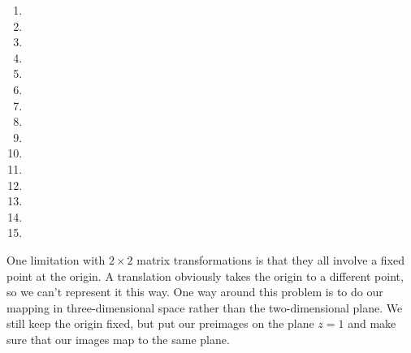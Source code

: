 \documentclass[../gatm.tex]{subfiles}
\begin{document}
\begin{enumerate}
\begin{multicols}{4}
\begin{enumerate}
\item {}
\item {}
\item {}
\item {}
\item {}
\item {}
\item {}
\item {}
\item {}
\item {}
\item {}
\item {}
\item {}
\item {}
\item {}
\end{enumerate}
\end{multicols}
\setcounter{mp_problem_i}{\value{enumi}}
\end{enumerate}

One limitation with $2\times 2$ matrix transformations is that they all involve a fixed point at the origin. A translation obviously takes the origin to a different point, so we can't represent it this way. One way around this problem is to do our mapping in three-dimensional space rather than the two-dimensional plane. We still keep the origin fixed, but put our preimages on the plane $z=1$ and make sure that our images map to the same plane.
\end{document}
